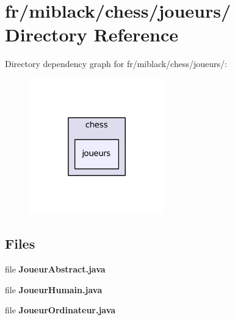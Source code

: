 \section{fr/miblack/chess/joueurs/ Directory Reference}
\label{dir_8e59cd9f163ee7760aa63b3e0033a09f}
Directory dependency graph for fr/miblack/chess/joueurs/\-:
\nopagebreak
\begin{figure}[H]
\begin{center}
\leavevmode
\includegraphics[width=166pt]{dir_8e59cd9f163ee7760aa63b3e0033a09f_dep}
\end{center}
\end{figure}
\subsection*{Files}
\begin{DoxyCompactItemize}
\item 
file {\bf Joueur\-Abstract.\-java}
\item 
file {\bf Joueur\-Humain.\-java}
\item 
file {\bf Joueur\-Ordinateur.\-java}
\end{DoxyCompactItemize}
